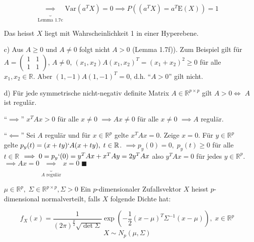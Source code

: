 \documentclass[12pt, a4paper]{article}
\newcommand{\E}{\mbox{I\negthinspace E}}
\theoremstyle{plain}
\theoremstyle{definition}
\newcommand{\R}{\mathbb{R}}
\newcommand{\1}{\mathds{1}}
\renewcommand{\E}{\mathrm{E}}
\newcommand{\Var}{\mathrm{Var}}
\begin{document}
\[ \underbrace{\implies}_{\text{Lemma 1.7c}} \Var(a^T X) = 0 \implies P((a^T X) = a^T \E(X)) = 1   \]

Das heisst $X$ liegt mit Wahrscheinlichkeit 1 in einer Hyperebene.

c) Aus $A \geq 0$ und $A \neq 0$ folgt nicht $A > 0$ (Lemma 1.7f)). Zum Beispiel gilt für $A = \begin{pmatrix} 1 & 1 \\ 1 & 1 \end{pmatrix}$, $A\neq 0$, $(x_1, x_2) A (x_1, x_2)^T = (x_1 + x_2)^2 \geq 0$ für alle $x_1, x_2 \in \R$. Aber $(1, -1) A (1, -1)^T = 0$, d.h. ``$A>0$'' gilt nicht.

d) Für jede symmetrische nicht-negativ definite Matrix $A \in \R^{p \times p}$ gilt $ A > 0 \iff$ $A$ ist regulär. 

``$\implies$'' $ x^T A x > 0$ für alle $x \neq 0$ $\implies Ax \neq 0$ für alle $x \neq 0$ $\implies A$ regulär. 

``$\impliedby$'' Sei $A$ regulär und für $x \in \R^p$ gelte $x^T A x = 0$. Zeige $x=0$. Für $y \in \R^p$ gelte $p_y (t) = (x+ty)` A (x+ty), \; t \in \R$. $\implies p_y(0)=0, \; p_y(t) \geq 0$ für alle $t \in \R$ $\implies 0 = p_y ` (0) = y^T A x + x^T A y = 2y^T A x$ also $y^T A x = 0$ für jedes $y \in \R^p$. $\implies Ax = 0 \underbrace{\implies}_{\text{$A$ regulär}} x = 0 \; \blacksquare$

$\mu \in \R^p, \; \Sigma \in \R^{p \times p}, \Sigma > 0$ 
Ein $p$-dimensionaler Zufallsvektor $X$ heisst $p$-dimensional normalverteilt, falls $X$ folgende Dichte hat:

\[ f_X (x) = \frac{1}{(2\pi)^\frac{p}{2} \sqrt{\det \Sigma}} \exp \left( -  \frac{1}{2}(x-\mu)^T \Sigma^{-1} (x-\mu)   \right), \; x \in \R^p  \]
\[ X \sim N_p (\mu, \Sigma)   \]
\end{document}
